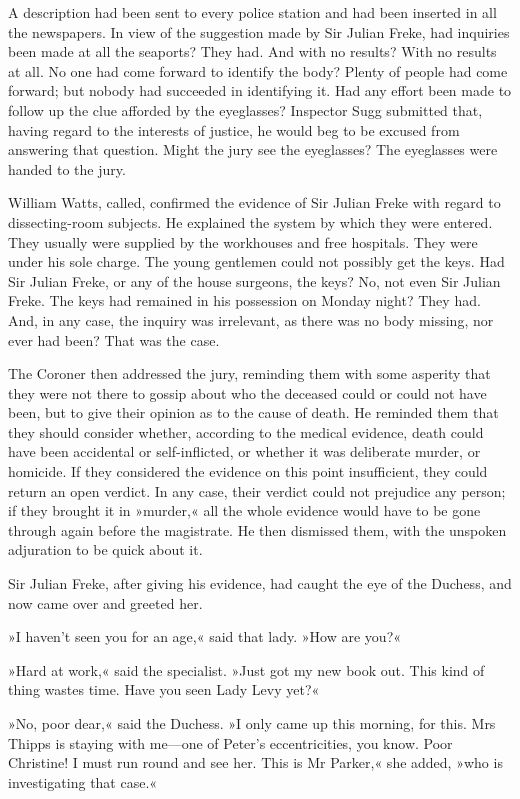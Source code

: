 A description had been sent to every police station and had been inserted in all the newspapers. In view of the suggestion made by Sir Julian Freke, had inquiries been made at all the seaports? They had. And with no results? With no results at all. No one had come forward to identify the body? Plenty of people had come forward; but nobody had succeeded in identifying it. Had any effort been made to follow up the clue afforded by the eyeglasses? Inspector Sugg submitted that, having regard to the interests of justice, he would beg to be excused from answering that question. Might the jury see the eyeglasses? The eyeglasses were handed to the jury.

William Watts, called, confirmed the evidence of Sir Julian Freke with regard to dissecting-room subjects. He explained the system by which they were entered. They usually were supplied by the workhouses and free hospitals. They were under his sole charge. The young gentlemen could not possibly get the keys. Had Sir Julian Freke, or any of the house surgeons, the keys? No, not even Sir Julian Freke. The keys had remained in his possession on Monday night? They had. And, in any case, the inquiry was irrelevant, as there was no body missing, nor ever had been? That was the case.

The Coroner then addressed the jury, reminding them with some asperity that they were not there to gossip about who the deceased could or could not have been, but to give their opinion as to the cause of death. He reminded them that they should consider whether, according to the medical evidence, death could have been accidental or self-inflicted, or whether it was deliberate murder, or homicide. If they considered the evidence on this point insufficient, they could return an open verdict. In any case, their verdict could not prejudice any person; if they brought it in »murder,« all the whole evidence would have to be gone through again before the magistrate. He then dismissed them, with the unspoken adjuration to be quick about it.

Sir Julian Freke, after giving his evidence, had caught the eye of the Duchess, and now came over and greeted her.

»I haven't seen you for an age,« said that lady. »How are you?«

»Hard at work,« said the specialist. »Just got my new book out. This kind of thing wastes time. Have you seen Lady Levy yet?«

»No, poor dear,« said the Duchess. »I only came up this morning, for this. Mrs Thipps is staying with me—one of Peter's eccentricities, you know. Poor Christine! I must run round and see her. This is Mr Parker,« she added, »who is investigating that case.«

